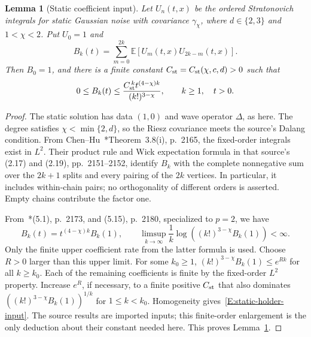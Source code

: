 \documentclass[12pt]{article}
\numberwithin{equation}{section}
\newtheorem{lemma}[theorem]{Lemma}
\theoremstyle{definition}
\newcommand{\E}{\mathbb{E}}
\begin{document}
\begin{lemma}[Static coefficient input]\label{L:static-holder-input}
  Let $U_n(t,x)$ be the ordered Stratonovich integrals for static Gaussian
  noise with covariance $\gamma_\chi$, where
  $d \in \{2,3\}$ and $1 < \chi < 2$. Put $U_0=1$ and
  \[
    B_k(t)=\sum_{m=0}^{2k}\E[U_m(t,x)U_{2k-m}(t,x)].
  \]
  Then $B_0=1$, and there is a finite constant
  $C_{\rm st}=C_{\rm st}(\chi,c,d)>0$ such that
  \begin{equation}\label{E:static-holder-input}
    0\le B_k(t)\le
    \frac{C_{\rm st}^{\,k}t^{(4-\chi)k}}{(k!)^{3-\chi}},
    \qquad k\ge1,\quad t>0.
  \end{equation}
\end{lemma}

\begin{proof}
  The static solution has data $(1,0)$ and wave operator $\Delta$, as here.
  The degree satisfies $\chi<\min\{2,d\}$, so the Riesz covariance meets
  the source's Dalang condition. From
  Chen--Hu~\cite{chen.hu:25:hyperbolic}*{Theorem~3.8(i), p.~2165},
  the fixed-order integrals exist in $L^2$. Their product rule and Wick
  expectation formula in that source's (2.17) and (2.19),
  pp.~2151--2152, identify $B_k$ with the complete nonnegative sum over
  the $2k+1$ splits and every pairing of the $2k$ vertices. In particular,
  it includes within-chain pairs; no orthogonality of different orders
  is asserted. Empty chains contribute the factor one.

  From~\cite{chen.hu:25:hyperbolic}*{(5.1), p.~2173, and (5.15), p.~2180},
  specialized to $p=2$, we have
  \[
    B_k(t)=t^{(4-\chi)k}B_k(1),\qquad
    \limsup_{k\to\infty}\frac1k
    \log\left((k!)^{3-\chi}B_k(1)\right)<\infty.
  \]
  Only the finite upper coefficient rate from the latter formula is
  used. Choose $R>0$ larger than this upper limit. For some $k_0\ge1$,
  $(k!)^{3-\chi}B_k(1)\le e^{Rk}$ for all $k\ge k_0$.
  Each of the remaining coefficients is finite by the fixed-order
  $L^2$ property. Increase $e^R$, if necessary, to a finite positive
  $C_{\rm st}$ that also dominates
  $\left((k!)^{3-\chi}B_k(1)\right)^{1/k}$ for $1\le k<k_0$.
  Homogeneity gives~\eqref{E:static-holder-input}. The source results
  are imported inputs; this finite-order enlargement is the only
  deduction about their constant needed here. This proves
  Lemma~\ref{L:static-holder-input}.
\end{proof}
\end{document}
